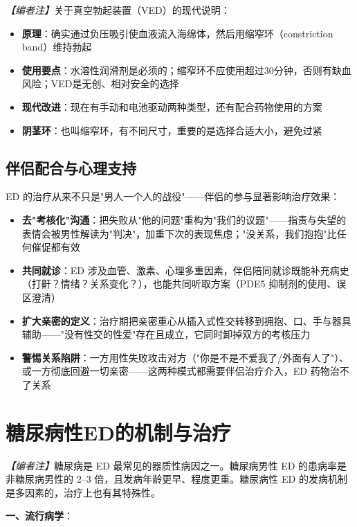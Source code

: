 \noindent\textit{【编者注】}关于真空勃起装置（VED）的现代说明：
\begin{itemize}
	\item \textbf{原理}：确实通过负压吸引使血液流入海绵体，然后用缩窄环（constriction band）维持勃起
	\item \textbf{使用要点}：水溶性润滑剂是必须的；缩窄环不应使用超过30分钟，否则有缺血风险；VED是无创、相对安全的选择
	\item \textbf{现代改进}：现在有手动和电池驱动两种类型，还有配合药物使用的方案
	\item \textbf{阴茎环}：也叫缩窄环，有不同尺寸，重要的是选择合适大小，避免过紧
\end{itemize}
\subsection{伴侣配合与心理支持}


ED 的治疗从来不只是"男人一个人的战役"——伴侣的参与显著影响治疗效果：

\begin{itemize}
	\item \textbf{去"考核化"沟通}：把失败从"他的问题"重构为"我们的议题"——指责与失望的表情会被男性解读为"判决"，加重下次的表现焦虑；"没关系，我们抱抱"比任何催促都有效
	\item \textbf{共同就诊}：ED 涉及血管、激素、心理多重因素，伴侣陪同就诊既能补充病史（打鼾？情绪？关系变化？），也能共同听取方案（PDE5 抑制剂的使用、误区澄清）
	\item \textbf{扩大亲密的定义}：治疗期把亲密重心从插入式性交转移到拥抱、口、手与器具辅助——"没有性交的性爱"存在且成立，它同时卸掉双方的考核压力
	\item \textbf{警惕关系陷阱}：一方用性失败攻击对方（"你是不是不爱我了/外面有人了"）、或一方彻底回避一切亲密——这两种模式都需要伴侣治疗介入，ED 药物治不了关系
\end{itemize}


\section{糖尿病性ED的机制与治疗}
\label{sec:diabetic_ed}

\noindent\textit{【编者注】}糖尿病是 ED 最常见的器质性病因之一。糖尿病男性 ED 的患病率是非糖尿病男性的 2--3 倍，且发病年龄更早、程度更重。糖尿病性 ED 的发病机制是多因素的，治疗上也有其特殊性。

\vspace{0.5em}
\noindent\textbf{一、流行病学}：

